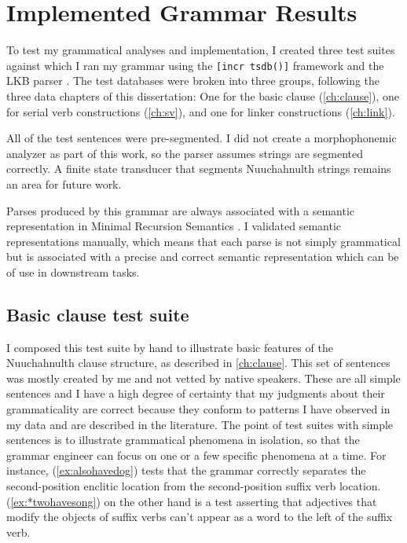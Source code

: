 \chapter{Implemented Grammar Results} \label{ch:results}

To test my grammatical analyses and implementation, I created three test suites against which I ran my grammar using the \texttt{[incr tsdb()]} framework \citep{oepen2001} and the LKB parser \citep{copestake2002}. The test databases were broken into three groups, following the three data chapters of this dissertation: One for the basic clause (\cref{ch:clause}), one for serial verb constructions (\cref{ch:sv}), and one for linker constructions (\cref{ch:link}).

All of the test sentences were pre-segmented. I did not create a morphophonemic analyzer as part of this work, so the parser assumes strings are segmented correctly. A finite state transducer that segments Nuuchahnulth strings remains an area for future work.

Parses produced by this grammar are always associated with a semantic representation in Minimal Recursion Semantics \citep{copestake2005}. I validated semantic representations manually, which means that each parse is not simply grammatical but is associated with a precise and correct semantic representation which can be of use in downstream tasks.

\section{Basic clause test suite} \label{ch:results:clause}

I composed this test suite by hand to illustrate basic features of the Nuuchahnulth clause structure, as described in \cref{ch:clause}. This set of sentences was mostly created by me and not vetted by native speakers. These are all simple sentences and I have a high degree of certainty that my judgments about their grammaticality are correct because they conform to patterns I have observed in my data and are described in the literature. The point of test suites with simple sentences is to illustrate grammatical phenomena in isolation, so that the grammar engineer can focus on one or a few specific phenomena at a time. For instance, (\ref{ex:alsohavedog}) tests that the grammar correctly separates the second-position enclitic location from the second-position suffix verb location. (\ref{ex:*twohavesong}) on the other hand is a test asserting that adjectives that modify the objects of suffix verbs can't appear as a word to the left of the suffix verb.

